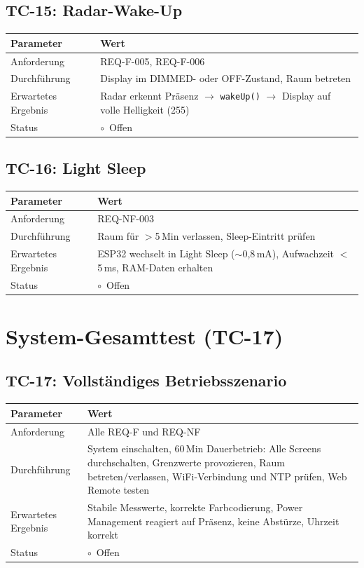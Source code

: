 \documentclass[a4paper,11pt]{article}
\begin{document}
\subsection{TC-15: Radar-Wake-Up}
\begin{tabularx}{\textwidth}{lX}
\toprule
\rowcolor{tableheader}
\textbf{Parameter} & \textbf{Wert} \\
\midrule
Anforderung & REQ-F-005, REQ-F-006 \\
Durchführung & Display im DIMMED- oder OFF-Zustand, Raum betreten \\
Erwartetes Ergebnis & Radar erkennt Präsenz $\to$ \texttt{wakeUp()} $\to$ Display auf volle Helligkeit (255) \\
Status & $\circ$~Offen \\
\bottomrule
\end{tabularx}

\subsection{TC-16: Light Sleep}
\begin{tabularx}{\textwidth}{lX}
\toprule
\rowcolor{tableheader}
\textbf{Parameter} & \textbf{Wert} \\
\midrule
Anforderung & REQ-NF-003 \\
Durchführung & Raum für $>$5\,Min verlassen, Sleep-Eintritt prüfen \\
Erwartetes Ergebnis & ESP32 wechselt in Light Sleep ($\sim$0{,}8\,mA), Aufwachzeit $<$5\,ms, RAM-Daten erhalten \\
Status & $\circ$~Offen \\
\bottomrule
\end{tabularx}

\section{System-Gesamttest (TC-17)}

\subsection{TC-17: Vollständiges Betriebsszenario}
\begin{tabularx}{\textwidth}{lX}
\toprule
\rowcolor{tableheader}
\textbf{Parameter} & \textbf{Wert} \\
\midrule
Anforderung & Alle REQ-F und REQ-NF \\
Durchführung & System einschalten, 60\,Min Dauerbetrieb: Alle Screens durchschalten, Grenzwerte provozieren, Raum betreten/verlassen, WiFi-Verbindung und NTP prüfen, Web Remote testen \\
Erwartetes Ergebnis & Stabile Messwerte, korrekte Farbcodierung, Power Management reagiert auf Präsenz, keine Abstürze, Uhrzeit korrekt \\
Status & $\circ$~Offen \\
\bottomrule
\end{tabularx}
\end{document}

